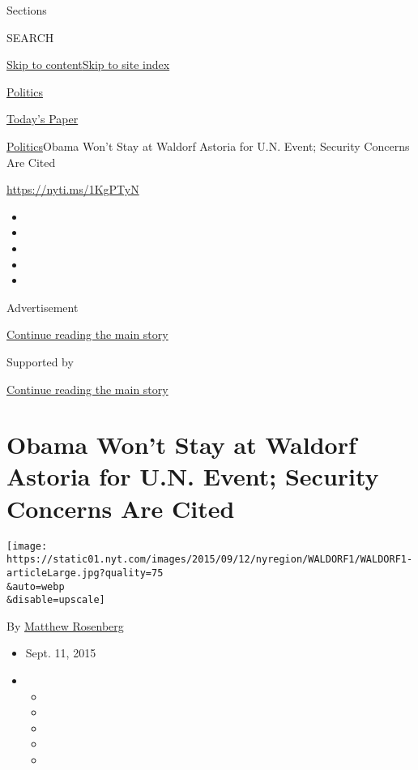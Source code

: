 Sections

SEARCH

\protect\hyperlink{site-content}{Skip to
content}\protect\hyperlink{site-index}{Skip to site index}

\href{https://www.nytimes.com/section/politics}{Politics}

\href{https://myaccount.nytimes.com/auth/login?response_type=cookie\&client_id=vi}{}

\href{https://www.nytimes.com/section/todayspaper}{Today's Paper}

\href{/section/politics}{Politics}\textbar{}Obama Won't Stay at Waldorf
Astoria for U.N. Event; Security Concerns Are Cited

\url{https://nyti.ms/1KgPTyN}

\begin{itemize}
\item
\item
\item
\item
\item
\end{itemize}

Advertisement

\protect\hyperlink{after-top}{Continue reading the main story}

Supported by

\protect\hyperlink{after-sponsor}{Continue reading the main story}

\hypertarget{obama-wont-stay-at-waldorf-astoria-for-un-event-security-concerns-are-cited}{%
\section{Obama Won't Stay at Waldorf Astoria for U.N. Event; Security
Concerns Are
Cited}\label{obama-wont-stay-at-waldorf-astoria-for-un-event-security-concerns-are-cited}}

\texttt{[image: https://static01.nyt.com/images/2015/09/12/nyregion/WALDORF1/WALDORF1-articleLarge.jpg?quality=75\\\&auto=webp\\\&disable=upscale]}

By \href{http://www.nytimes.com/by/matthew-rosenberg}{Matthew Rosenberg}

\begin{itemize}
\item
  Sept. 11, 2015
\item
  \begin{itemize}
  \item
  \item
  \item
  \item
  \item
  \end{itemize}
\end{itemize}

